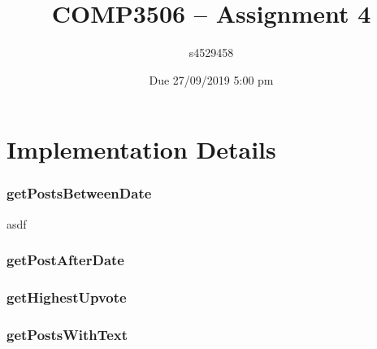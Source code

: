 \documentclass[11pt,a4paper]{article} %
\author{s4529458}
\date{{Due 27/09/2019 5:00 pm}}
\title{COMP3506 -- Assignment 4}
\begin{document}
%

\setcounter{page}{1}
\maketitle

\part*{Implementation Details}

\section*{getPostsBetweenDate}
asdf

\section*{getPostAfterDate}

\section*{getHighestUpvote}

\section*{getPostsWithText}
\end{document}
